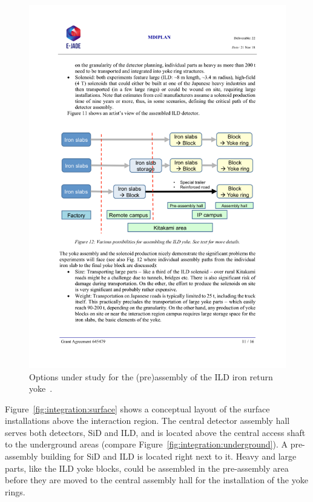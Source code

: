 \begin{figure}[h!]
\centering
\includegraphics[width=0.8\hsize]{Integration/fig/yoke_assembly.pdf}
\caption{\label{fig:integration:yoke_assembly}Options under study for the (pre)assembly of the ILD iron return yoke~\cite{ild:bib:ejade_mdi}.}
\end{figure}

Figure~\ref{fig:integration:surface} shows a conceptual layout of the surface installations above the interaction region. The central detector assembly hall serves both detectors, SiD and ILD, and is located above the central access shaft to the underground areas (compare Figure~\ref{fig:integration:underground}). A pre-assembly building for SiD and ILD is located right next to it. Heavy and large parts, like the ILD yoke blocks, could be assembled in the pre-assembly area before they are moved to the central assembly hall for the installation of the yoke rings.

